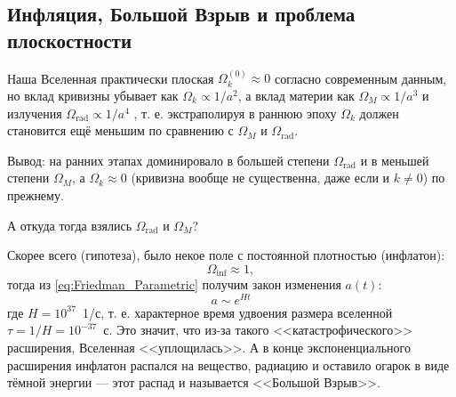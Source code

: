 \documentclass[]{article}
\begin{document}
\subsection{Инфляция, Большой Взрыв и проблема плоскостности}

Наша Вселенная практически плоская $\Omega_{k}^{(0)} \approx 0$ согласно современным данным, но вклад кривизны убывает как $\Omega_{k} \propto 1/a^2 $, а вклад материи как $\Omega_{M} \propto 1/a^3$ и излучения  $\Omega_\text{rad} \propto 1/a^4$ , т. е. экстраполируя в раннюю эпоху $\Omega_{k}$ должен становится ещё меньшим по сравнению с $\Omega_{M}$ и $\Omega_\text{rad}$.

Вывод: на ранних этапах доминировало в большей степени $\Omega_\text{rad}$ и в меньшей степени $\Omega_{M}$, а $\Omega_{k} \approx 0$ (кривизна вообще не существенна, даже если и $k \neq 0$) по прежнему.

\begin{tcolorbox}
	А откуда тогда взялись $\Omega_\text{rad}$ и $\Omega_{M}$?
\end{tcolorbox}

Скорее всего (гипотеза), было некое поле с постоянной плотностью (инфлатон):
\begin{equation}\label{eq:inflaton}
	\Omega_\text{inf} \approx 1,
\end{equation}
тогда из \eqref{eq:Friedman_Parametric} получим закон изменения $a(t)$:
\begin{equation}\label{eq:at}
	a \sim e^{Ht}
\end{equation}
где $H = 10^{37}$~1/с, т. е. характерное время удвоения размера вселенной $\tau = 1/H = 10^{-37}$~с. Это значит, что из-за такого <<катастрофического>> расширения, Вселенная <<уплощилась>>. А в конце экспоненциального расширения инфлатон распался на вещество, радиацию и оставило огарок в виде тёмной энергии ---  этот распад и называется <<Большой Взрыв>>.
\end{document}
